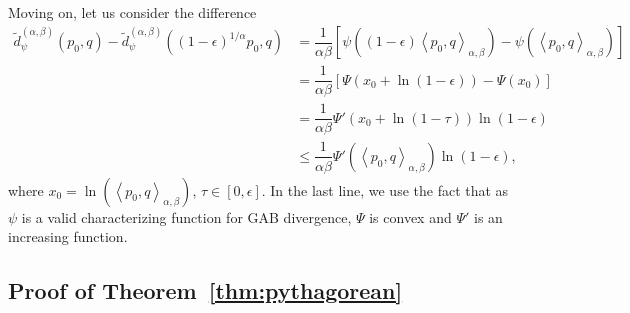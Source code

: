 \documentclass[11pt]{article}
\theoremstyle{plain}
\theoremstyle{remark}
\newcommand{\inner}[1]{\left\langle #1\right\rangle}
\begin{document}
Moving on, let us consider the difference
\begin{align*}
    \tilde{d}_{\psi}^{(\alpha,\beta)}(p_0, q) - \tilde{d}_{\psi}^{(\alpha,\beta)}((1-\epsilon)^{1/\alpha} p_0, q)
     & = \dfrac{1}{\alpha\beta}\left[ \psi\left( (1-\epsilon)\inner{p_0,q}_{\alpha,\beta} \right) - \psi\left( \inner{p_0,q}_{\alpha,\beta} \right) \right] \\
     & = \dfrac{1}{\alpha\beta}\left[ \Psi\left( x_0 + \ln(1-\epsilon) \right) - \Psi(x_0) \right]                                                          \\
     & = \dfrac{1}{\alpha\beta} \Psi'(x_0 + \ln(1-\tau)) \ln(1-\epsilon)                                                                                    \\
     & \leq \dfrac{1}{\alpha\beta} \Psi'\left( \inner{p_0,q}_{\alpha,\beta} \right) \ln(1-\epsilon),
\end{align*}
\noindent where $x_0 = \ln(\inner{p_0,q}_{\alpha,\beta})$, $\tau \in [0, \epsilon]$. In the last line, we use the fact that as $\psi$ is a valid characterizing function for GAB divergence, $\Psi$ is convex and $\Psi'$ is an increasing function.

\subsection{Proof of Theorem~\ref{thm:pythagorean}}\label{appendix-proof:thm-pythagorean}
\end{document}
